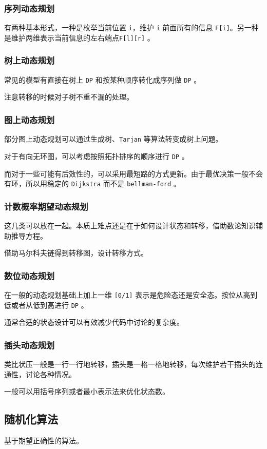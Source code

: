 \documentclass[UTF-8]{ctexart}
\begin{document}
	\subsubsection{序列动态规划}
	有两种基本形式，一种是枚举当前位置 \texttt{i}，维护 \texttt{i} 前面所有的信息 \texttt{F[i]}。另一种是维护两维表示当前信息的左右端点\texttt{F[l][r]} 。
	
	\subsubsection{树上动态规划}
	常见的模型有直接在树上 \texttt{DP} 和按某种顺序转化成序列做 \texttt{DP} 。
	
	注意转移的时候对子树不重不漏的处理。
	
	\subsubsection{图上动态规划}
	部分图上动态规划可以通过生成树、\texttt{Tarjan} 等算法转变成树上问题。
	
	对于有向无环图，可以考虑按照拓扑排序的顺序进行 \texttt{DP} 。
	
	而对于一些可能有后效性的，可以采用最短路的方式更新。由于最优决策一般不会有环，所以用稳定的 \texttt{Dijkstra} 而不是 \texttt{bellman-ford} 。
	
	\subsubsection{计数概率期望动态规划}
	这几类可以放在一起。本质上难点还是在于如何设计状态和转移，借助数论知识辅助推导方程。
	
	借助马尔科夫链得到转移图，设计转移方式。
	
	\subsubsection{数位动态规划}
	在一般的动态规划基础上加上一维 \texttt{[0/1]} 表示是危险态还是安全态。按位从高到低或者从低到高进行 \texttt{DP} 。
	
	通常合适的状态设计可以有效减少代码中讨论的复杂度。
	
	\subsubsection{插头动态规划}
	类比状压一般是一行一行地转移，插头是一格一格地转移，每次维护若干插头的连通性，讨论各种情况。
	
	一般可以用括号序列或者最小表示法来优化状态数。
	\subsection{随机化算法}
	基于期望正确性的算法。
	
\end{document}
